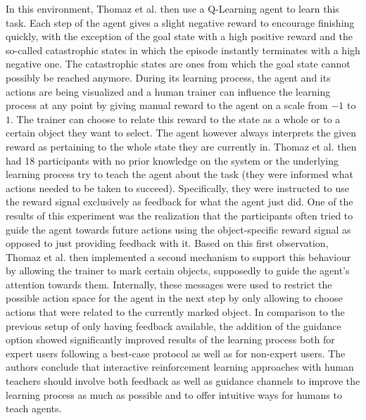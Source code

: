 \documentclass[12pt,twoside]{article}
\theoremstyle{plain}
\theoremstyle{definition}
\theoremstyle{remark}
\begin{document}
In this environment, Thomaz et al. then use a Q-Learning agent to learn this task. Each step of the agent gives a slight negative reward to encourage finishing quickly, with the exception of the goal state with a high positive reward and the so-called catastrophic states in which the episode instantly terminates with a high negative one. The catastrophic states are ones from which the goal state cannot possibly be reached anymore. During its learning process, the agent and its actions are being visualized and a human trainer can influence the learning process at any point by giving manual reward to the agent on a scale from $-1$ to $1$. The trainer can choose to relate this reward to the state as a whole or to a certain object they want to select. The agent however always interprets the given reward as pertaining to the whole state they are currently in. Thomaz et al. then had 18 participants with no prior knowledge on the system or the underlying learning process try to teach the agent about the task (they were informed what actions needed to be taken to succeed). Specifically, they were instructed to use the reward signal exclusively as feedback for what the agent just did. One of the results of this experiment was the realization that the participants often tried to guide the agent towards future actions using the object-specific reward signal as opposed to just providing feedback with it. Based on this first observation, Thomaz et al. then implemented a second mechanism to support this behaviour by allowing the trainer to mark certain objects, supposedly to guide the agent's attention towards them. Internally, these messages were used to restrict the possible action space for the agent in the next step by only allowing to choose actions that were related to the currently marked object. In comparison to the previous setup of only having feedback available, the addition of the guidance option showed significantly improved results of the learning process both for expert users following a best-case protocol as well as for non-expert users. The authors conclude that interactive reinforcement learning approaches with human teachers should involve both feedback as well as guidance channels to improve the learning process as much as possible and to offer intuitive ways for humans to teach agents.
\\
\end{document}
